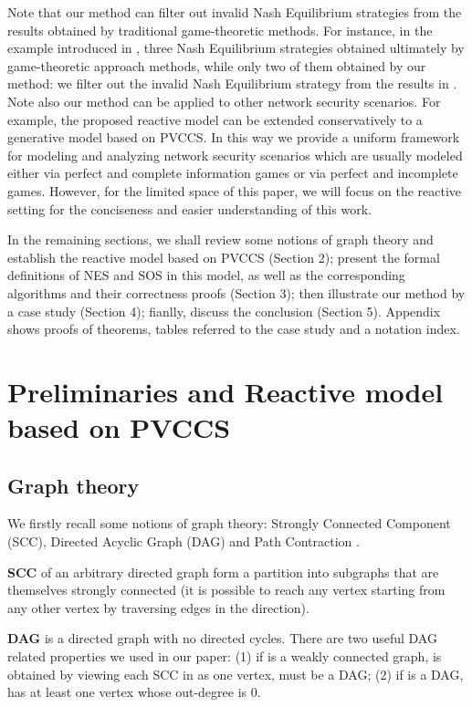 \documentclass{acm_proc_article-sp}
\begin{document}
Note that our method can filter out invalid Nash Equilibrium strategies from the results obtained by traditional game-theoretic methods. For instance, in the example introduced in \cite{klye},
three Nash Equilibrium strategies obtained ultimately by game-theoretic approach methods,
while only two of them obtained by our method:
we filter out the invalid Nash Equilibrium strategy from the results in \cite{klye}.
Note also our method can be applied to other network security scenarios.
For example, the proposed reactive model can be extended conservatively to a generative model based on PVCCS.
In this way we provide a uniform framework for modeling and analyzing network security scenarios which are usually modeled either via perfect and complete information games or via perfect and incomplete games.
However, for the limited space of this paper, we will focus on the reactive setting for the conciseness and easier understanding of this work.

In the remaining sections, we shall
review some notions of graph theory and establish the reactive model based on PVCCS (Section 2);
present the formal definitions of NES and SOS in this model, as well as the corresponding algorithms
and their correctness proofs (Section 3);
then illustrate our method by a case study (Section 4);
fianlly, discuss the conclusion (Section 5).
Appendix shows proofs of theorems, tables referred to the case study and a notation index.

\section{Preliminaries and Reactive model based on PVCCS}

\subsection{Graph theory}
We firstly recall some notions of graph theory: Strongly Connected Component (SCC), Directed Acyclic Graph (DAG) and Path Contraction \cite{reinhard,serge,david}.

\textbf{SCC} of an arbitrary directed graph form a partition into subgraphs that are themselves strongly connected (it is possible to reach any vertex starting from any other vertex by traversing edges in the direction).

\textbf{DAG} is a directed graph with no directed cycles. There are two useful DAG related properties we used in our paper: (1) if  is a weakly connected graph,  is obtained by viewing each SCC in  as one vertex,  must be a DAG; (2) if  is a DAG,  has at least one vertex whose out-degree is 0.
\end{document}
